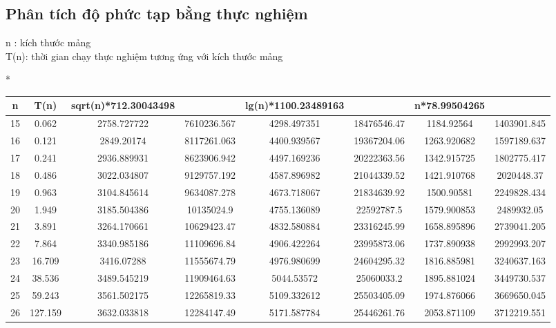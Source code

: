 \documentclass{article}
\begin{document}
    \subsection{ \fontsize{16}{16}\selectfont\textbf{Phân tích độ phức tạp bằng thực nghiệm}}
 n : kích thước mảng \\
T(n): thời gian chạy thực nghiệm tương ứng với kích thước mảng
    
    \begin{flushleft}
    
        \begin{adjustbox}{width=1.1\textwidth,center=\textwidth}
        *\begin{tabular}{|c|c|c|c|c|c|c|c|}
        \hline
        {n} & {T(n)} & {sqrt(n)*712.30043498} &{} & {lg(n)*1100.23489163} &{} &{n*78.99504265}&{}\\
     	\hline
        15&	0.062	&2758.727722&	7610236.567	&4298.497351&	18476546.47&	1184.92564&	1403901.845\\
        \hline
        16	&0.121	&2849.20174&	8117261.063	&4400.939567	&19367204.06&	1263.920682&	1597189.637\\
        \hline
        17&0.241&	2936.889931	&8623906.942	&4497.169236&	20222363.56	&1342.915725&	1802775.417 \\
        \hline
        18&	0.486&	3022.034807&	9129757.192&	4587.896982&	21044339.52	&1421.910768	&2020448.37\\
        \hline
        19	&0.963	&3104.845614	&9634087.278	&4673.718067	&21834639.92	&1500.90581	&2249828.434\\
        \hline
        20	&1.949&	3185.504386	&10135024.9	&4755.136089&	22592787.5&	1579.900853&	2489932.05\\
        \hline
        21&3.891	&3264.170661	&10629423.47	&4832.580884	&23316245.99	&1658.895896	&2739041.205\\
        \hline
        22	&7.864&	3340.985186	&11109696.84&	4906.422264	&23995873.06&	1737.890938	&2992993.207\\
        \hline
        23	&16.709&	3416.07288	&11555674.79	&4976.980699&	24604295.32	&1816.885981	&3240637.163\\
        \hline
        24&	38.536	&3489.545219&	11909464.63	&5044.53572	&25060033.2	&1895.881024&	3449730.537\\
        \hline
        25&	59.243&	3561.502175	&12265819.33	&5109.332612	&25503405.09	&1974.876066	&3669650.045\\
        \hline
        26	&127.159&	3632.033818&	12284147.49	&5171.587784&	25446261.76&	2053.871109&	3712219.551\\

\end{tabular}
\end{adjustbox}
\end{flushleft}
\end{document}

